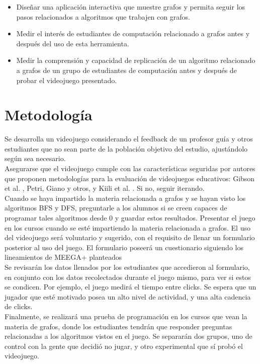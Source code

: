 \documentclass[submission]{eptcs}
\begin{document}
\begin{itemize}
\item Diseñar una aplicación interactiva que muestre grafos y permita seguir
los pasos relacionados a algoritmos que trabajen con grafos.

\item Medir el interés de estudiantes de computación relacionado a grafos
antes y después del uso de esta herramienta.

\item Medir la comprensión y capacidad de replicación de un algoritmo relacionado a grafos
de un grupo de estudiantes de computación antes y después de probar el videojuego presentado.

\end{itemize}

\section{Metodología}


Se desarrolla un videojuego considerando el feedback de un profesor guía y otros estudiantes
que no sean parte de la población objetivo del estudio, ajustándolo según sea necesario. \\
Asegurarse que el videojuego cumple con las características seguridas por autores que proponen
metodologías para la evaluación de videojuegos educativos: Gibson et al. \cite{evaluation_of_games_for_teaching_cs},
Petri, Giano y otros, \cite{petri2018method} y Kiili et al. \cite{using_videogames_maths}. Si no, seguir iterando. \\
Cuando se haya impartido la materia relacionada a grafos y se hayan visto los algoritmos BFS y DFS, preguntarle a
los alumnos si se creen capaces de programar tales algoritmos desde 0 y guardar estos resultados.
Presentar el juego en los cursos cuando se esté impartiendo la materia relacionada a grafos. El uso del
videojuego será voluntario y sugerido, con el requisito de llenar un formulario posterior al uso del juego.
El formulario poseerá un cuestionario siguiendo los lineamientos de MEEGA+ planteados \cite{petri2018meegaplus} \\
Se revisarán los datos llenados por los estudiantes que accedieron al formulario, en conjunto con los
datos recolectados durante el juego mismo, para ver si estos se condicen. Por ejemplo, el juego medirá el tiempo
entre clicks. Se espera que un jugador que esté motivado posea un alto nivel de actividad, y una alta cadencia de clicks. \\
Finalmente, se realizará una prueba de programación en los cursos que vean la materia de grafos, donde los estudiantes
tendrán que responder preguntas relacionadas a los algoritmos vistos en el juego. Se separarán dos grupos, 
uno de control con la gente que decidió no jugar, y otro experimental que sí probó el videojuego.
\end{document}
